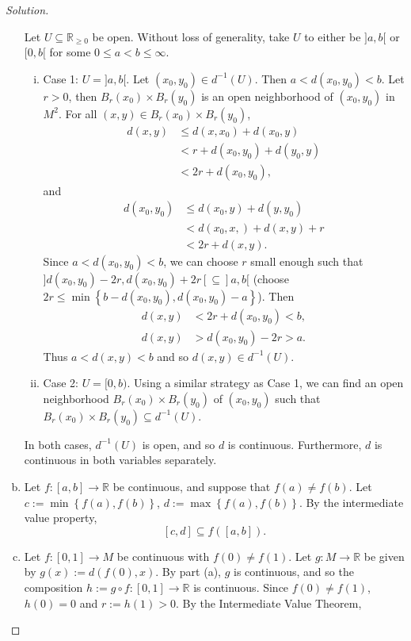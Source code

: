 \documentclass[12pt]{article}
\newcommand{\real}{\mathbb{R}}
\newcommand\inv[1]{#1^{-1}}
\newcommand\paren[1]{\left( #1 \right)}
\newcommand\setb[1]{\left \{ #1 \right \}}
\theoremstyle{definition}
\begin{document}
\begin{proof}[Solution]
\begin{enumerate}[a)]
        Let $U \subseteq \mathbb{R}_{\geq 0}$ be open. Without loss of generality, take $U$ to either be $]a,b[$ or $[0,b[$ for some $0 \leq a < b \leq \infty$.
        \begin{enumerate}[(i)]
            \item Case 1: $U = ]a,b[$. Let $(x_0,y_0) \in \inv{d}(U)$. Then $a < d(x_0,y_0) < b$. Let $r > 0$, then $B_{r}(x_0) \times B_{r}(y_0)$ is an open neighborhood of $(x_0,y_0)$ in $M^2$. For all $(x,y) \in B_r(x_0) \times B_r(y_0)$,
            \begin{align*}
                d(x,y) & \leq d(x,x_0) + d(x_0,y) \\
                & < r + d(x_0,y_0) + d(y_0,y) \\
                & < 2r + d(x_0,y_0),
            \end{align*}
            and 
            \begin{align*}
                d(x_0,y_0) & \leq d(x_0,y) + d(y,y_0) \\
                & < d(x_0,x,) + d(x,y) + r \\
                & < 2r + d(x,y).
            \end{align*}
            Since $a < d(x_0,y_0) < b$, we can choose $r$ small enough such that $]d(x_0,y_0) - 2r , d(x_0,y_0) + 2r[ \subseteq ]a,b[$ (choose $2r \leq \min \setb{ b - d(x_0,y_0) , d(x_0,y_0) - a }$). Then
            \begin{align*}
                d(x,y) & < 2r + d(x_0,y_0) < b, \\
                d(x,y) & > d(x_0,y_0) - 2r > a.
            \end{align*}
            Thus $a < d(x,y) < b$ and so $d(x,y) \in \inv{d}(U)$.
            \item Case 2: $U = [0,b)$. Using a similar strategy as Case 1, we can find an open neighborhood $B_r(x_0) \times B_r(y_0)$ of $(x_0,y_0)$ such that $B_r(x_0) \times B_r(y_0) \subseteq \inv{d}(U)$.
        \end{enumerate}
        In both cases, $\inv{d}(U)$ is open, and so $d$ is continuous. Furthermore, $d$ is continuous in both variables separately.
        \item Let $f : [a,b] \to \real$ be continuous, and suppose that $f(a) \neq f(b)$. Let $c := \min \setb{ f(a) , f(b) }$, $d := \max \setb{ f(a) , f(b) }$. By the intermediate value property, 
        \[
            [c,d] \subseteq f \paren{ [a,b] }.
        \]
        \item Let $f : [0,1] \to M$ be continuous with $f(0) \neq f(1)$. Let $g : M \to \real$ be given by $g(x) := d(f(0),x)$. By part (a), $g$ is continuous, and so the composition $h := g \circ f : [0,1] \to \real$ is continuous. Since $f(0) \neq f(1)$, $h(0) = 0$ and $r := h(1) > 0$. By the Intermediate Value Theorem, 

\end{enumerate}
\end{proof}
\end{document}
